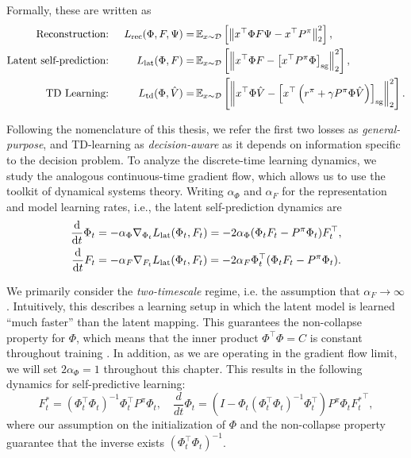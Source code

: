Formally, these are written as
\begin{align}
    \text{Reconstruction: }&& L_{\text{rec}}(\Phi,F,\Psi) =& \,\mathbb{E}_{x \sim \mathcal{D}}\left[  \left\lVert x^\top \Phi F \Psi - x^\top {P^\pi} \right\rVert_2^2 \right],\\
    \text{Latent self-prediction: }&& L_{\text{lat}}(\Phi,F) =& \,\mathbb{E}_{x \sim \mathcal{D}}\left[  \left\lVert x^\top \Phi F - \left[x^\top {P^\pi} \Phi\right]_{\mathrm{sg}} \right\rVert_2^2 \right], \\
    \text{TD Learning: }&& L_{\text{td}}(\Phi,\hat{V}) =& \,\mathbb{E}_{x \sim \mathcal{D}}\left[  \left\lVert x^\top \Phi \hat{V} - \left[x^\top  \left(r^\pi + \gamma P^\pi \Phi \hat{V}\right)\right]_{\mathrm{sg}} \right\rVert_2^2 \right].
\end{align}

Following the nomenclature of this thesis, we refer the first two losses as \emph{general-purpose}, and TD-learning as \emph{decision-aware} as it depends on information specific to the decision problem.
To analyze the discrete-time learning dynamics, we study the analogous continuous-time gradient flow, which allows us to use the toolkit of dynamical systems theory.
Writing $\alpha_\Phi$ and $\alpha_F$ for the representation and model learning rates, i.e., the latent self-prediction dynamics are
\begin{align}
    \frac{\mathrm{d}}{\mathrm{d} t} \Phi_t &= -\alpha_\Phi\nabla_{\Phi_t} {L}_{\text{lat}}(\Phi_t, F_t) = -2 \alpha_\Phi (\Phi_t F_t - P^\pi \Phi_t)  F_t^\top,\\
    \frac{\mathrm{d}}{\mathrm{d} t} F_t  &= -\alpha_F\nabla_{F_t} {L}_{\text{lat}}(\Phi_t, F_t) = -2 \alpha_F \Phi_t^\top(\Phi_t F_t - P^\pi \Phi_t).
\end{align}

We primarily consider the \emph{two-timescale} regime, i.e. the assumption that $\alpha_F\to \infty$ \parencite{tang2022understanding}. 
Intuitively, this describes a learning setup in which the latent model is learned ``much faster'' than the latent mapping. 
This guarantees the non-collapse property for $\Phi$, which means that the inner product $\Phi^\top\Phi = C$ is constant throughout training \parencite{tang2022understanding}.
In addition, as we are operating in the gradient flow limit, we will set $2\alpha_\Phi = 1$ throughout this chapter.
This results in the following dynamics for self-predictive learning:
\begin{equation}
    \label{eq:understanding:BYOLTwoTimescale}
    F_t^* = \left(\Phi_t^\top\Phi_t\right)^{-1} \Phi_t^\top P^\pi \Phi_t, \quad \frac{d}{dt}\Phi_t = \left(I-\Phi_t\left(\Phi_t^\top \Phi_t\right)^{-1}\Phi_t^\top\right)P^\pi \Phi_t {F_t^*}^\top,
\end{equation}
where our assumption on the initialization of $\Phi$ and the non-collapse property guarantee that the inverse exists $\left(\Phi_t^\top\Phi_t\right)^{-1}$.

